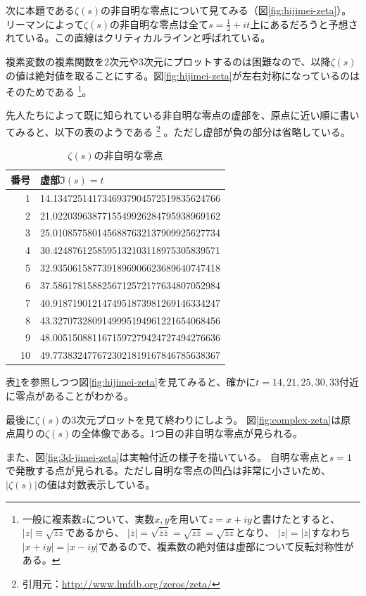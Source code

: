 \documentclass[11pt,b5paper,papersize,dvipdfmx]{jsbook}
\begin{document}
次に本題である$\zeta(s)$の非自明な零点について見てみる（図\ref{fig:hijimei-zeta}）。リーマンによって$\zeta(s)$の非自明な零点は全て$s=\frac12+it$上にあるだろうと予想されている。この直線はクリティカルラインと呼ばれている。\par
複素変数の複素関数を2次元や3次元にプロットするのは困難なので、以降$\zeta(s)$の値は絶対値を取ることにする。図\ref{fig:hijimei-zeta}が左右対称になっているのはそのためである
\footnote{
  一般に複素数$z$について、実数$x,y$を用いて$z=x+iy$と書けたとすると、$|z|\equiv\sqrt{\bar{z}z}$であるから、
  $|\bar{z}| = \sqrt{\bar{\bar{z}}\bar{z}} = \sqrt{z\bar{z}} = \sqrt{\bar{z}z}$となり、
  $|z|=|\bar{z}|$すなわち$|x+iy|=|x-iy|$であるので、複素数の絶対値は虚部について反転対称性がある。
}。\par
先人たちによって既に知られている非自明な零点の虚部を、原点に近い順に書いてみると、以下の表のようである
\footnote{引用元：\url{http://www.lmfdb.org/zeros/zeta/}}
。ただし虚部が負の部分は省略している。
%
\begin{table}[H]
  \small
  \centering
  \caption{$\zeta(s)$の非自明な零点}
  \label{tb:hijimei-zeta}
  \begin{tabular}{rl}\hline
    番号 & 虚部$\Im(s)=t$\\ \hline
    1 & 14.1347251417346937904572519835624766\\
    2 & 21.0220396387715549926284795938969162\\
    3 & 25.0108575801456887632137909925627734\\
    4 & 30.4248761258595132103118975305839571\\
    5 & 32.9350615877391896906623689640747418\\
    6 & 37.5861781588256712572177634807052984\\
    7 & 40.9187190121474951873981269146334247\\
    8 & 43.3270732809149995194961221654068456\\
    9 & 48.0051508811671597279424727494276636\\
    10 & 49.7738324776723021819167846785638367 \\ \hline
  \end{tabular}
\end{table}
%
表\ref{tb:hijimei-zeta}を参照しつつ図\ref{fig:hijimei-zeta}を見てみると、確かに$t=14,21,25,30,33$付近に零点があることがわかる。\par
最後に$\zeta(s)$の3次元プロットを見て終わりにしよう。
図\ref{fig:complex-zeta}は原点周りの$\zeta(s)$の全体像である。1つ目の非自明な零点が見られる。\par
また、図\ref{fig:3d-jimei-zeta}は実軸付近の様子を描いている。
自明な零点と$s=1$で発散する点が見られる。ただし自明な零点の凹凸は非常に小さいため、$|\zeta(s)|$の値は対数表示している。
\end{document}
